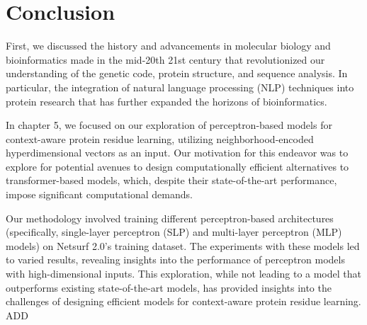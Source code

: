 \chapter{Conclusion}
First, we discussed the history and advancements in molecular biology and bioinformatics made in the mid-20th 21st century that revolutionized our understanding of the genetic code, protein structure, and sequence analysis. In particular, the integration of natural language processing (NLP) techniques into protein research that has further expanded the horizons of bioinformatics.

In chapter 5, we focused on our exploration of perceptron-based models for context-aware protein residue learning, utilizing neighborhood-encoded hyperdimensional vectors as an input. Our motivation for this endeavor was to explore for potential avenues to design computationally efficient alternatives to transformer-based models, which, despite their state-of-the-art performance, impose significant computational demands.

Our methodology involved training different perceptron-based architectures (specifically, single-layer perceptron (SLP) and multi-layer perceptron (MLP) models) on Netsurf 2.0's training dataset. The experiments with these models led to varied results, revealing insights into the performance of perceptron models with high-dimensional inputs. This exploration, while not leading to a model that outperforms existing state-of-the-art models, has provided insights into the challenges of designing efficient models for context-aware protein residue learning. ADD